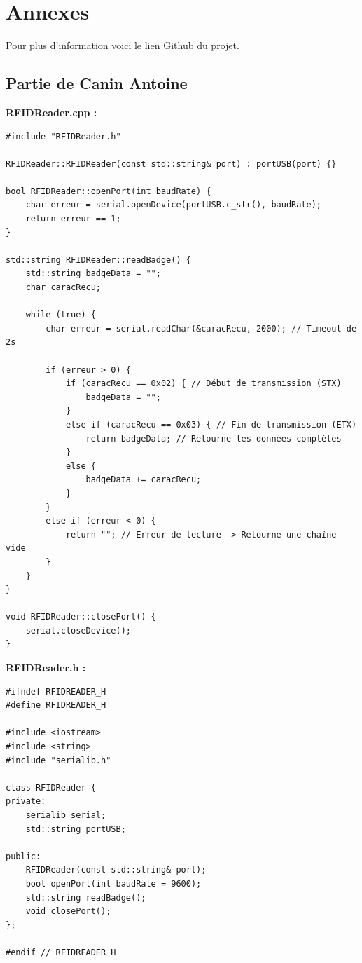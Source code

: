 \documentclass[main.tex]{subfiles}
\begin{document}


\section{Annexes}

Pour plus d'information voici le lien \href{https://github.com/Xela0309/CasiersRFID}{Github} du projet.
\subsection{Partie de Canin Antoine}

\textbf{RFIDReader.cpp :}

\begin{lstlisting}
#include "RFIDReader.h"

RFIDReader::RFIDReader(const std::string& port) : portUSB(port) {}

bool RFIDReader::openPort(int baudRate) {
    char erreur = serial.openDevice(portUSB.c_str(), baudRate);
    return erreur == 1;
}

std::string RFIDReader::readBadge() {
    std::string badgeData = "";
    char caracRecu;

    while (true) {
        char erreur = serial.readChar(&caracRecu, 2000); // Timeout de 2s

        if (erreur > 0) {
            if (caracRecu == 0x02) { // Début de transmission (STX)
                badgeData = "";
            }
            else if (caracRecu == 0x03) { // Fin de transmission (ETX)
                return badgeData; // Retourne les données complètes
            }
            else {
                badgeData += caracRecu;
            }
        }
        else if (erreur < 0) {
            return ""; // Erreur de lecture -> Retourne une chaîne vide
        }
    }
}

void RFIDReader::closePort() {
    serial.closeDevice();
}
\end{lstlisting}

\textbf{RFIDReader.h :}

\begin{lstlisting}
#ifndef RFIDREADER_H
#define RFIDREADER_H

#include <iostream>
#include <string>
#include "serialib.h"

class RFIDReader {
private:
    serialib serial;
    std::string portUSB;

public:
    RFIDReader(const std::string& port);
    bool openPort(int baudRate = 9600);
    std::string readBadge();
    void closePort();
};

#endif // RFIDREADER_H
\end{lstlisting}
\end{document}
